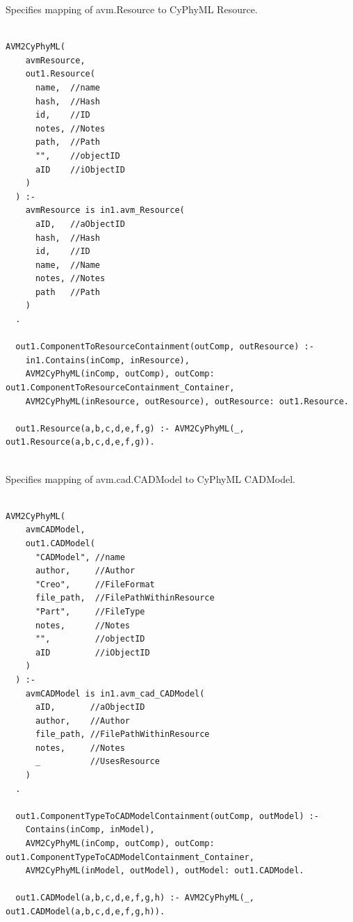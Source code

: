 Specifies mapping of avm.Resource to CyPhyML Resource.
\begin{lstlisting}

AVM2CyPhyML(
    avmResource,
    out1.Resource(
      name,  //name
      hash,  //Hash
      id,    //ID
      notes, //Notes
      path,  //Path
      "",    //objectID
      aID    //iObjectID
    )
  ) :-
    avmResource is in1.avm_Resource(
      aID,   //aObjectID
      hash,  //Hash
      id,    //ID
      name,  //Name
      notes, //Notes
      path   //Path
    )
  .

  out1.ComponentToResourceContainment(outComp, outResource) :-
    in1.Contains(inComp, inResource),
    AVM2CyPhyML(inComp, outComp), outComp: out1.ComponentToResourceContainment_Container,
    AVM2CyPhyML(inResource, outResource), outResource: out1.Resource.

  out1.Resource(a,b,c,d,e,f,g) :- AVM2CyPhyML(_, out1.Resource(a,b,c,d,e,f,g)).


\end{lstlisting}

Specifies mapping of avm.cad.CADModel to CyPhyML CADModel.
\begin{lstlisting}

AVM2CyPhyML(
    avmCADModel,
    out1.CADModel(
      "CADModel", //name
      author,     //Author
      "Creo",     //FileFormat
      file_path,  //FilePathWithinResource
      "Part",     //FileType
      notes,      //Notes
      "",         //objectID
      aID         //iObjectID
    )
  ) :-
    avmCADModel is in1.avm_cad_CADModel(
      aID,       //aObjectID
      author,    //Author
      file_path, //FilePathWithinResource
      notes,     //Notes
      _          //UsesResource
    )
  .

  out1.ComponentTypeToCADModelContainment(outComp, outModel) :-
    Contains(inComp, inModel),
    AVM2CyPhyML(inComp, outComp), outComp: out1.ComponentTypeToCADModelContainment_Container,
    AVM2CyPhyML(inModel, outModel), outModel: out1.CADModel.

  out1.CADModel(a,b,c,d,e,f,g,h) :- AVM2CyPhyML(_, out1.CADModel(a,b,c,d,e,f,g,h)).


\end{lstlisting}

